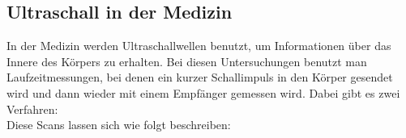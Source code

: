 \subsection{Ultraschall in der Medizin}
In der Medizin werden Ultraschallwellen benutzt, um Informationen über das Innere des Körpers zu erhalten. Bei diesen Untersuchungen benutzt man Laufzeitmessungen, bei denen ein kurzer Schallimpuls in den Körper gesendet wird und dann wieder mit einem Empfänger gemessen wird. Dabei gibt es zwei Verfahren:\\
Diese Scans lassen sich wie folgt beschreiben:
